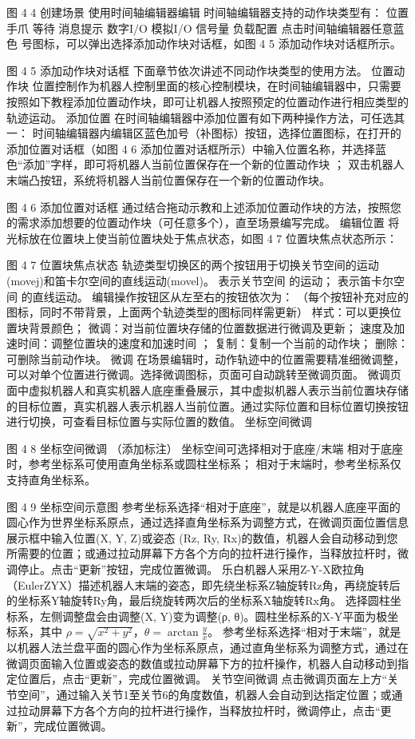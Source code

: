 图 4 4  创建场景
使用时间轴编辑器编辑
时间轴编辑器支持的动作块类型有：
位置
手爪
等待
消息提示
数字I/O
模拟I/O
信号量
负载配置
点击时间轴编辑器任意蓝色 号图标，可以弹出选择添加动作块对话框，如图 4 5 添加动作块对话框所示。
 
图 4 5 添加动作块对话框
下面章节依次讲述不同动作块类型的使用方法。
位置动作块
位置控制作为机器人控制里面的核心控制模块，在时间轴编辑器中，只需要按照如下教程添加位置动作块，即可让机器人按照预定的位置动作进行相应类型的轨迹运动。
添加位置 
在时间轴编辑器中添加位置有如下两种操作方法，可任选其一：
时间轴编辑器内编辑区蓝色加号（补图标）按钮，选择位置图标，在打开的添加位置对话框（如图 4 6 添加位置对话框所示）中输入位置名称，并选择蓝色“添加”字样，即可将机器人当前位置保存在一个新的位置动作块 ；
双击机器人末端凸按钮，系统将机器人当前位置保存在一个新的位置动作块。
 
图 4 6  添加位置对话框
通过结合拖动示教和上述添加位置动作块的方法，按照您的需求添加想要的位置动作块（可任意多个），直至场景编写完成。
编辑位置
将光标放在位置块上使当前位置块处于焦点状态，如图 4 7  位置块焦点状态所示：
 
图 4 7  位置块焦点状态
轨迹类型切换区的两个按钮用于切换关节空间的运动(movej)和笛卡尔空间的直线运动(movel)。
 表示关节空间 的运动；
 表示笛卡尔空间 的直线运动。
编辑操作按钮区从左至右的按钮依次为：
（每个按钮补充对应的图标，同时不带背景，上面两个轨迹类型的图标同样需更新）
样式：可以更换位置块背景颜色；
微调：对当前位置块存储的位置数据进行微调及更新；
速度及加速时间：调整位置块的速度和加速时间 ；
复制：复制一个当前的动作块；
删除：可删除当前动作块。
	微调
在场景编辑时，动作轨迹中的位置需要精准细微调整，可以对单个位置进行微调。选择微调图标，页面可自动跳转至微调页面。
微调页面中虚拟机器人和真实机器人底座重叠展示，其中虚拟机器人表示当前位置块存储的目标位置，真实机器人表示机器人当前位置。通过实际位置和目标位置切换按钮 进行切换，可查看目标位置与实际位置的数值。
	坐标空间微调
 
图 4 8  坐标空间微调
（添加标注）
坐标空间可选择相对于底座/末端
相对于底座时，参考坐标系可使用直角坐标系或圆柱坐标系；
相对于末端时，参考坐标系仅支持直角坐标系。
 
图 4 9  坐标空间示意图
参考坐标系选择“相对于底座”，就是以机器人底座平面的圆心作为世界坐标系原点，通过选择直角坐标系为调整方式，在微调页面位置信息展示框中输入位置(X, Y, Z)或姿态 (Rz, Ry, Rx)的数值，机器人会自动移动到您所需要的位置；或通过拉动屏幕下方各个方向的拉杆进行操作，当释放拉杆时，微调停止。点击“更新”按钮，完成位置微调。
乐白机器人采用Z-Y-X欧拉角（EulerZYX）描述机器人末端的姿态，即先绕坐标系Z轴旋转Rz角，再绕旋转后的坐标系Y轴旋转Ry角，最后绕旋转两次后的坐标系X轴旋转Rx角。
选择圆柱坐标系，左侧调整盘会由调整(X, Y)变为调整(ρ, θ)。圆柱坐标系的X-Y平面为极坐标系，其中 $\rho=\sqrt{x^2+y^2}$，$\theta=\arctan\frac{y}{x}$。
参考坐标系选择“相对于末端”，就是以机器人法兰盘平面的圆心作为坐标系原点，通过直角坐标系为调整方式，通过在微调页面输入位置或姿态的数值或拉动屏幕下方的拉杆操作，机器人自动移动到指定位置后，点击“更新”，完成位置微调。
	关节空间微调
点击微调页面左上方“关节空间”，通过输入关节1至关节6的角度数值，机器人会自动到达指定位置；或通过拉动屏幕下方各个方向的拉杆进行操作，当释放拉杆时，微调停止，点击“更新”，完成位置微调。

